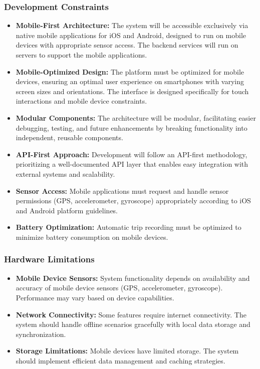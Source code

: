 \subsubsection*{Development Constraints}
\begin{itemize}
    \item \textbf{Mobile-First Architecture:} 
    The system will be accessible exclusively via native mobile applications for iOS and Android, designed to run on mobile devices with appropriate sensor access. The backend services will run on servers to support the mobile applications.
    \item \textbf{Mobile-Optimized Design:} 
    The platform must be optimized for mobile devices, ensuring an optimal user experience on smartphones with varying screen sizes and orientations. The interface is designed specifically for touch interactions and mobile device constraints.
    \item \textbf{Modular Components:} 
    The architecture will be modular, facilitating easier debugging, testing, and future enhancements by breaking functionality into independent, reusable components.
    \item \textbf{API-First Approach:} 
    Development will follow an API-first methodology, prioritizing a well-documented API layer that enables easy integration with external systems and scalability.
    \item \textbf{Sensor Access:} 
    Mobile applications must request and handle sensor permissions (GPS, accelerometer, gyroscope) appropriately according to iOS and Android platform guidelines.
    \item \textbf{Battery Optimization:} 
    Automatic trip recording must be optimized to minimize battery consumption on mobile devices.
\end{itemize}

\subsubsection*{Hardware Limitations}
\begin{itemize}
    \item \textbf{Mobile Device Sensors:} 
    System functionality depends on availability and accuracy of mobile device sensors (GPS, accelerometer, gyroscope). Performance may vary based on device capabilities.
    \item \textbf{Network Connectivity:} 
    Some features require internet connectivity. The system should handle offline scenarios gracefully with local data storage and synchronization.
    \item \textbf{Storage Limitations:} 
    Mobile devices have limited storage. The system should implement efficient data management and caching strategies.
\end{itemize}

